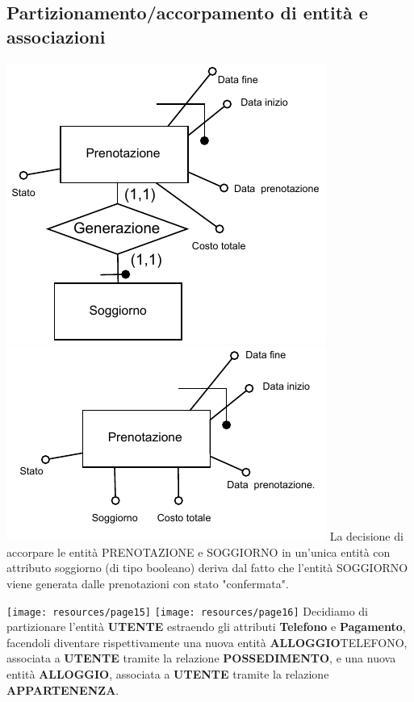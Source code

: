 \subsection{Partizionamento/accorpamento di entità e associazioni}
\includegraphics[width=\textwidth]{resources/page13}
\includegraphics[width=\textwidth]{resources/page14}
La decisione di accorpare le entità PRENOTAZIONE e SOGGIORNO in un'unica entità con attributo soggiorno (di tipo booleano) deriva dal fatto che l'entità SOGGIORNO viene generata dalle prenotazioni con stato "confermata".

\texttt{[image: resources/page15]}
\texttt{[image: resources/page16]}
Decidiamo di partizionare l'entità \textbf{UTENTE} estraendo gli attributi \textbf{Telefono} e \textbf{Pagamento}, facendoli diventare rispettivamente una nuova entità \textbf{ALLOGGIO}TELEFONO, associata a \textbf{UTENTE} tramite la relazione \textbf{POSSEDIMENTO}, e una nuova entità \textbf{ALLOGGIO}, associata a \textbf{UTENTE} tramite la relazione \textbf{APPARTENENZA}.

